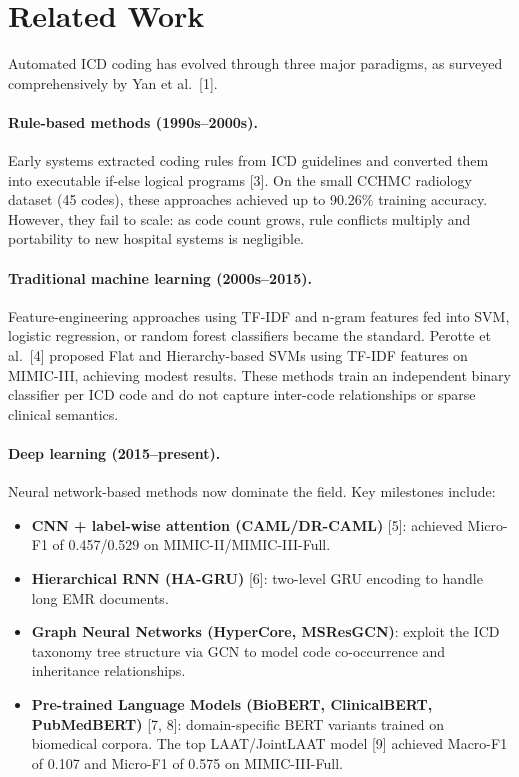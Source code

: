 \documentclass[10pt,a4paper,twocolumn]{article}
\begin{document}
\section{Related Work}
\label{sec:related}

Automated ICD coding has evolved through three major paradigms, as surveyed
comprehensively by Yan et al.\ [1].

\paragraph{Rule-based methods (1990s--2000s).}
Early systems extracted coding rules from ICD guidelines and converted them into
executable if-else logical programs [3]. On the small CCHMC radiology dataset
(45 codes), these approaches achieved up to 90.26\% training accuracy. However,
they fail to scale: as code count grows, rule conflicts multiply and portability
to new hospital systems is negligible.

\paragraph{Traditional machine learning (2000s--2015).}
Feature-engineering approaches using TF-IDF and n-gram features fed into SVM,
logistic regression, or random forest classifiers became the standard. Perotte
et al.\ [4] proposed Flat and Hierarchy-based SVMs using TF-IDF features on
MIMIC-III, achieving modest results. These methods train an independent binary
classifier per ICD code and do not capture inter-code relationships or sparse
clinical semantics.

\paragraph{Deep learning (2015--present).}
Neural network-based methods now dominate the field. Key milestones include:
\begin{itemize}
  \item \textbf{CNN + label-wise attention (CAML/DR-CAML)} [5]:
        achieved Micro-F1 of 0.457/0.529 on MIMIC-II/MIMIC-III-Full.
  \item \textbf{Hierarchical RNN (HA-GRU)} [6]: two-level GRU encoding to
        handle long EMR documents.
  \item \textbf{Graph Neural Networks (HyperCore, MSResGCN)}: exploit the
        ICD taxonomy tree structure via GCN to model code co-occurrence and
        inheritance relationships.
  \item \textbf{Pre-trained Language Models (BioBERT, ClinicalBERT,
        PubMedBERT)} [7, 8]: domain-specific BERT variants trained on biomedical
        corpora. The top LAAT/JointLAAT model [9] achieved Macro-F1 of 0.107
        and Micro-F1 of 0.575 on MIMIC-III-Full.
\end{itemize}
\end{document}
